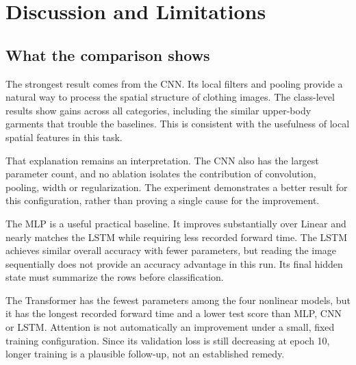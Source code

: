 \section{Discussion and Limitations}
\subsection{What the comparison shows}
The strongest result comes from the CNN. Its local filters and pooling provide
a natural way to process the spatial structure of clothing images.
The class-level results show gains across all categories, including the
similar upper-body garments that trouble the baselines. This is consistent
with the usefulness of local spatial features in this task.

That explanation remains an interpretation. The CNN also has the largest
parameter count, and no ablation isolates the contribution of convolution,
pooling, width or regularization. The experiment demonstrates a better result
for this configuration, rather than proving a single cause for the improvement.

The MLP is a useful practical baseline. It improves substantially over Linear
and nearly matches the LSTM while requiring less recorded forward time.
The LSTM achieves similar overall accuracy with fewer parameters, but reading
the image sequentially does not provide an accuracy advantage in this run.
Its final hidden state must summarize the rows before classification.

The Transformer has the fewest parameters among the four nonlinear models,
but it has the longest recorded forward time and a lower test score than MLP,
CNN or LSTM. Attention is not automatically an improvement under a small,
fixed training configuration. Since its validation loss is still decreasing
at epoch 10, longer training is a plausible follow-up, not an established remedy.

